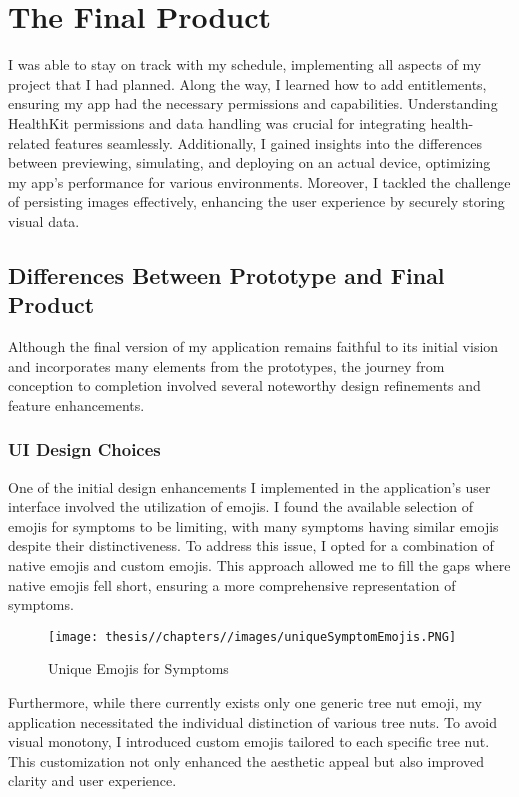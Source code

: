 \chapter{The Final Product}

I was able to stay on track with my schedule, implementing all aspects of my project that I had planned. Along the way, I learned how to add entitlements, ensuring my app had the necessary permissions and capabilities. Understanding HealthKit permissions and data handling was crucial for integrating health-related features seamlessly. Additionally, I gained insights into the differences between previewing, simulating, and deploying on an actual device, optimizing my app's performance for various environments. Moreover, I tackled the challenge of persisting images effectively, enhancing the user experience by securely storing visual data.

\section{Differences Between Prototype and Final Product}

Although the final version of my application remains faithful to its initial vision and incorporates many elements from the prototypes, the journey from conception to completion involved several noteworthy design refinements and feature enhancements.

\subsection{UI Design Choices}

One of the initial design enhancements I implemented in the application's user interface involved the utilization of emojis. I found the available selection of emojis for symptoms to be limiting, with many symptoms having similar emojis despite their distinctiveness. To address this issue, I opted for a combination of native emojis and custom emojis. This approach allowed me to fill the gaps where native emojis fell short, ensuring a more comprehensive representation of symptoms.

\begin{figure} [H]
    \centering
    \texttt{[image: thesis//chapters//images/uniqueSymptomEmojis.PNG]}
    \caption{Unique Emojis for Symptoms}
    \label{fig:enter-label}
\end{figure}

Furthermore, while there currently exists only one generic tree nut emoji, my application necessitated the individual distinction of various tree nuts. To avoid visual monotony, I introduced custom emojis tailored to each specific tree nut. This customization not only enhanced the aesthetic appeal but also improved clarity and user experience.

